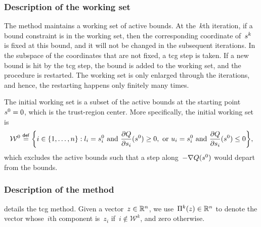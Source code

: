 \subsubsection{Description of the working set}

The method maintains a working set of active bounds.
At the~$k$th iteration, if a bound constraint is in the working set, then the corresponding coordinate of~$\sstep[k]$ is fixed at this bound, and it will not be changed in the subsequent iterations.
In the subspace of the coordinates that are not fixed, a \gls{tcg} step is taken.
If a new bound is hit by the \gls{tcg} step, the bound is added to the working set, and the procedure is restarted.
The working set is only enlarged through the iterations, and hence, the restarting happens only finitely many times.

The initial working set is a subset of the active bounds at the starting point~$\sstep[0] = 0$, which is the trust-region center.
More specifically, the initial working set is
\begin{equation}
    \label{eq:bounds-initial-working-set}
    \mathcal{W}^0 \eqdef \set[\bigg]{i \in \set{1, \dots, n} : \xl_i = \sstep[0]_i ~ \text{and} ~ \frac{\partial Q}{\partial \sstep_i}(\sstep[0]) \ge 0, ~ \text{or} ~ \xu_i = \sstep[0]_i
~ \text{and} ~ \frac{\partial Q}{\partial \sstep_i}(\sstep[0]) \le 0},
\end{equation}
which excludes the active bounds such that a step along~$-\nabla Q(\sstep[0])$ would depart from the bounds.

\subsubsection{Description of the  method}

 details the \gls{tcg} method.
Given a vector~$z \in \mathbb{R}^n$, we use~$\Pi^k(z) \in \mathbb{R}^n$ to denote the vector whose~$i$th component is~$z_i$ if~$i \notin \mathcal{W}^k$, and zero otherwise.

